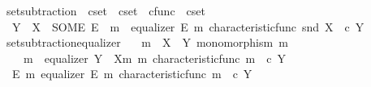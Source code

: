 \begin{isabellebody}
%
\endisadelimproof
%
\isadelimdocument
%
\endisadelimdocument
%
\isatagdocument
%
\isamarkuptrue%
%
\endisatagdocument
{\isafolddocument}%
%
\isadelimdocument
%
\endisadelimdocument
{}\isamarkupfalse%
\ set{\isacharunderscore}{\kern0pt}subtraction\ {\isacharcolon}{\kern0pt}{\isacharcolon}{\kern0pt}\ {\isachardoublequoteopen}cset\ {\isasymRightarrow}\ cset\ {\isasymtimes}\ cfunc\ {\isasymRightarrow}\ cset{\isachardoublequoteclose}\ {\isacharparenleft}{\kern0pt}\ {\isachardoublequoteopen}{\isasymsetminus}{\isachardoublequoteclose}\ {}{}{\isacharparenright}{\kern0pt}\ \isanewline
\ \ {\isachardoublequoteopen}Y\ {\isasymsetminus}\ X\ {\isacharequal}{\kern0pt}\ {\isacharparenleft}{\kern0pt}SOME\ E{\isachardot}{\kern0pt}\ {\isasymexists}\ m{\isacharprime}{\kern0pt}{\isachardot}{\kern0pt}\ \ equalizer\ E\ m{\isacharprime}{\kern0pt}\ {\isacharparenleft}{\kern0pt}characteristic{\isacharunderscore}{\kern0pt}func\ {\isacharparenleft}{\kern0pt}snd\ X{\isacharparenright}{\kern0pt}{\isacharparenright}{\kern0pt}\ {\isacharparenleft}{\kern0pt}{\isasymf}\ {\isasymcirc}\isactrlsub c\ {\isasymbeta}\isactrlbsub Y\isactrlesub {\isacharparenright}{\kern0pt}{\isacharparenright}{\kern0pt}{\isachardoublequoteclose}\isanewline
\isanewline
{}\isamarkupfalse%
\ set{\isacharunderscore}{\kern0pt}subtraction{\isacharunderscore}{\kern0pt}equalizer{\isacharcolon}{\kern0pt}\isanewline
\ \ \ {\isachardoublequoteopen}m\ {\isacharcolon}{\kern0pt}\ X\ {\isasymrightarrow}\ Y{\isachardoublequoteclose}\ {\isachardoublequoteopen}monomorphism\ m{\isachardoublequoteclose}\isanewline
\ \ \ {\isachardoublequoteopen}{\isasymexists}\ m{\isacharprime}{\kern0pt}{\isachardot}{\kern0pt}\ \ equalizer\ {\isacharparenleft}{\kern0pt}Y\ {\isasymsetminus}\ {\isacharparenleft}{\kern0pt}X{\isacharcomma}{\kern0pt}m{\isacharparenright}{\kern0pt}{\isacharparenright}{\kern0pt}\ m{\isacharprime}{\kern0pt}\ {\isacharparenleft}{\kern0pt}characteristic{\isacharunderscore}{\kern0pt}func\ m{\isacharparenright}{\kern0pt}\ {\isacharparenleft}{\kern0pt}{\isasymf}\ {\isasymcirc}\isactrlsub c\ {\isasymbeta}\isactrlbsub Y\isactrlesub {\isacharparenright}{\kern0pt}{\isachardoublequoteclose}\isanewline
%
\isadelimproof
%
\endisadelimproof
%
\isatagproof
{}\isamarkupfalse%
\ {\isacharminus}{\kern0pt}\isanewline
\ \ \isamarkupfalse%
\ {\isachardoublequoteopen}{\isasymexists}\ E\ m{\isacharprime}{\kern0pt}{\isachardot}{\kern0pt}\ equalizer\ E\ m{\isacharprime}{\kern0pt}\ {\isacharparenleft}{\kern0pt}characteristic{\isacharunderscore}{\kern0pt}func\ m{\isacharparenright}{\kern0pt}\ {\isacharparenleft}{\kern0pt}{\isasymf}\ {\isasymcirc}\isactrlsub c\ {\isasymbeta}\isactrlbsub Y\isactrlesub {\isacharparenright}{\kern0pt}{\isachardoublequoteclose}\isanewline

\end{isabellebody}
